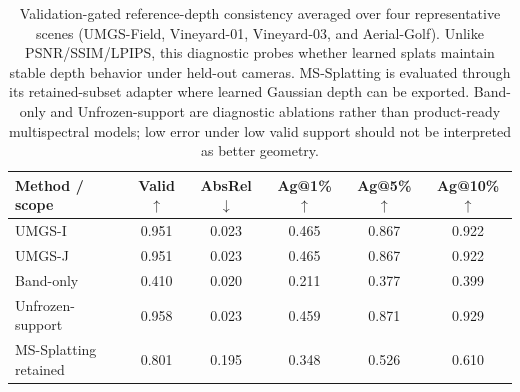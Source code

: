 ﻿\begin{table}[!t]
    \caption{Validation-gated reference-depth consistency averaged over four representative scenes (UMGS-Field, Vineyard-01, Vineyard-03, and Aerial-Golf). Unlike PSNR/SSIM/LPIPS, this diagnostic probes whether learned splats maintain stable depth behavior under held-out cameras. MS-Splatting is evaluated through its retained-subset adapter where learned Gaussian depth can be exported. Band-only and Unfrozen-support are diagnostic ablations rather than product-ready multispectral models; low error under low valid support should not be interpreted as better geometry.}
    \label{tab:validated-depth}
    \centering
    \scriptsize
    \setlength{\tabcolsep}{3pt}
    \begin{tabular}{lccccc}
        \toprule
        Method / scope & Valid $\uparrow$ & AbsRel $\downarrow$ & Ag@1\% $\uparrow$ & Ag@5\% $\uparrow$ & Ag@10\% $\uparrow$ \\
        \midrule
        UMGS-I & 0.951 & 0.023 & 0.465 & 0.867 & 0.922 \\
        UMGS-J & 0.951 & 0.023 & 0.465 & 0.867 & 0.922 \\
        \midrule
        Band-only & 0.410 & 0.020 & 0.211 & 0.377 & 0.399 \\
        Unfrozen-support & 0.958 & 0.023 & 0.459 & 0.871 & 0.929 \\
        MS-Splatting retained & 0.801 & 0.195 & 0.348 & 0.526 & 0.610 \\
        \bottomrule
    \end{tabular}
\end{table}
